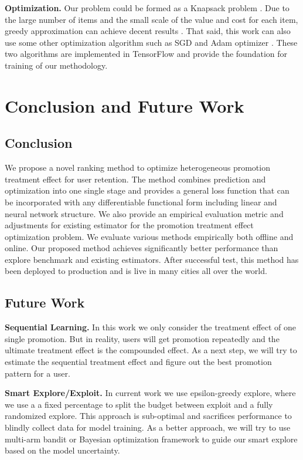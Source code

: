 \textbf{Optimization.} Our problem could be formed as a Knapsack problem \cite{hilliard2014algorithm}. Due to the large number of items and the small scale of the value and cost for each item, greedy approximation can achieve decent results \cite{dantzig1957discrete}. That said, this work can also use some other optimization algorithm such as SGD \cite{bottou2010large} and Adam optimizer \cite{kingma2014adam}. These two algorithms are implemented in TensorFlow \cite{abadi2016tensorflow} and provide the foundation for training of our methodology.


\section{Conclusion and Future Work}

\subsection{Conclusion}
We propose a novel ranking method to optimize heterogeneous promotion treatment effect for user retention. The method combines prediction and optimization into one single stage and provides a general loss function that can be incorporated with any differentiable functional form including linear and neural network structure. We also provide an empirical evaluation metric and adjustments for existing estimator for the promotion treatment effect optimization problem. We evaluate various methods empirically both offline and online. Our proposed method achieves significantly better performance than explore benchmark and existing estimators. After successful test, this method has been deployed to production and is live in many cities all over the world.

\subsection{Future Work}
\textbf{Sequential Learning.} In this work we only consider the treatment effect of one single promotion. But in reality, users will get promotion repeatedly and the ultimate treatment effect is the compounded effect. As a next step, we will try to estimate the sequential treatment effect and figure out the best promotion pattern for a user.

\textbf{Smart Explore/Exploit.} In current work we use epsilon-greedy explore, where we use a a fixed percentage to split the budget between exploit and a fully randomized explore. This approach is sub-optimal and sacrifices performance to blindly collect data for model training. As a better approach, we will try to use multi-arm bandit or Bayesian optimization framework to guide our smart explore based on the model uncertainty.

